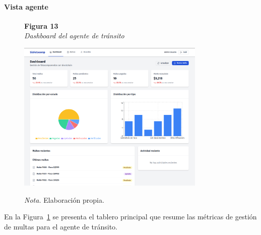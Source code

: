 \paragraph{Vista agente}
\begin{figure}[htbp]
    \begin{flushleft}
        \textbf{Figura 13}\\[2em]
        \textit{Dashboard del agente de tránsito}
    \end{flushleft}
    \vspace{1em}
    \centering
    \includegraphics[width=0.8\textwidth]{Images/UI3.png}
    \vspace{2em}
    \begin{flushleft}
        \textit{Nota.} Elaboración propia.
    \end{flushleft}
    \label{fig:dashboard_agente}
\end{figure}
En la Figura~\ref{fig:dashboard_agente} se presenta el tablero principal que resume las métricas de gestión de multas para el agente de tránsito.
